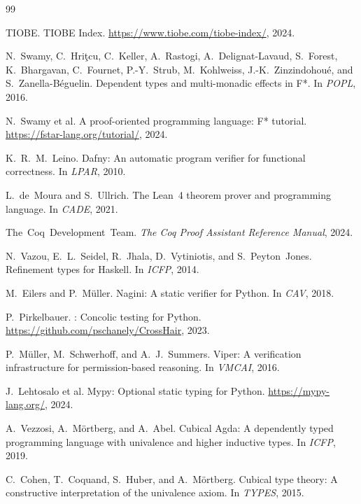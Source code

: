 \documentclass[acmsmall,nonacm,screen]{acmart}
\begin{document}
\begin{thebibliography}{99}

TIOBE.
\newblock TIOBE Index.
\newblock \url{https://www.tiobe.com/tiobe-index/}, 2024.

N.~Swamy, C.~Hri\c{t}cu, C.~Keller, A.~Rastogi, A.~Delignat-Lavaud,
  S.~Forest, K.~Bhargavan, C.~Fournet, P.-Y.~Strub, M.~Kohlweiss,
  J.-K.~Zinzindohou\'e, and S.~Zanella-B\'eguelin.
\newblock Dependent types and multi-monadic effects in {F*}.
\newblock In \emph{POPL}, 2016.

N.~Swamy et al.
\newblock A proof-oriented programming language: {F*} tutorial.
\newblock \url{https://fstar-lang.org/tutorial/}, 2024.

K.~R.~M.~Leino.
\newblock Dafny: An automatic program verifier for functional correctness.
\newblock In \emph{LPAR}, 2010.

L.~de~Moura and S.~Ullrich.
\newblock The {Lean~4} theorem prover and programming language.
\newblock In \emph{CADE}, 2021.

The~Coq~Development~Team.
\newblock \emph{The {Coq} Proof Assistant Reference Manual}, 2024.

N.~Vazou, E.~L.~Seidel, R.~Jhala, D.~Vytiniotis, and S.~Peyton~Jones.
\newblock Refinement types for {Haskell}.
\newblock In \emph{ICFP}, 2014.

M.~Eilers and P.~M\"uller.
\newblock Nagini: A static verifier for {Python}.
\newblock In \emph{CAV}, 2018.

P.~Pirkelbauer.
: Concolic testing for {Python}.
\newblock \url{https://github.com/pschanely/CrossHair}, 2023.

P.~M\"uller, M.~Schwerhoff, and A.~J.~Summers.
\newblock Viper: A verification infrastructure for permission-based reasoning.
\newblock In \emph{VMCAI}, 2016.

J.~Lehtosalo et al.
\newblock Mypy: Optional static typing for {Python}.
\newblock \url{https://mypy-lang.org/}, 2024.

A.~Vezzosi, A.~M\"ortberg, and A.~Abel.
\newblock Cubical {Agda}: A dependently typed programming language with
  univalence and higher inductive types.
\newblock In \emph{ICFP}, 2019.

C.~Cohen, T.~Coquand, S.~Huber, and A.~M\"ortberg.
\newblock Cubical type theory: A constructive interpretation of the
  univalence axiom.
\newblock In \emph{TYPES}, 2015.


\end{thebibliography}
\end{document}

